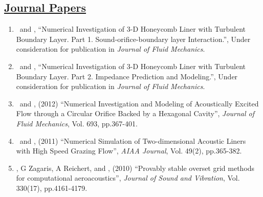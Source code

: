 \documentclass[11pt,letter]{article}
\begin{document}
\subsection*{\textbf{\underline{Journal Papers}}}
\begin{adjustwidth}{1em}{0pt}
\begin{enumerate}
\item \QZ\ and \DJB,  ``Numerical Investigation of 3-D Honeycomb Liner with Turbulent Boundary Layer. Part 1. Sound-orifice-boundary layer Interaction.'', Under consideration for publication in \emph{Journal of Fluid Mechanics}.
\item \QZ\ and \DJB,  ``Numerical Investigation of 3-D Honeycomb Liner with Turbulent Boundary Layer. Part 2. Impedance Prediction and Modeling.'', Under consideration for publication in \emph{Journal of Fluid Mechanics}.
\item \QZ\ and \DJB, (2012) ``Numerical Investigation and Modeling of Acoustically Excited Flow through a Circular Orifice Backed by a Hexagonal Cavity'', \emph{Journal of Fluid Mechanics}, Vol. 693, pp.367-401.
\item \QZ\  and \DJB, (2011) ``Numerical Simulation of Two-dimensional Acoustic Liners with High Speed Grazing Flow'', \emph{AIAA Journal}, Vol. 49(2), pp.365-382.
\item \DJB, G Zagaris, A Reichert, and  \QZ, (2010) ``Provably stable overset grid methods for computational aeroacoustics'', \emph{Journal of Sound and Vibration}, Vol. 330(17), pp.4161-4179.
\end{enumerate}
\end{adjustwidth}
\end{document}
